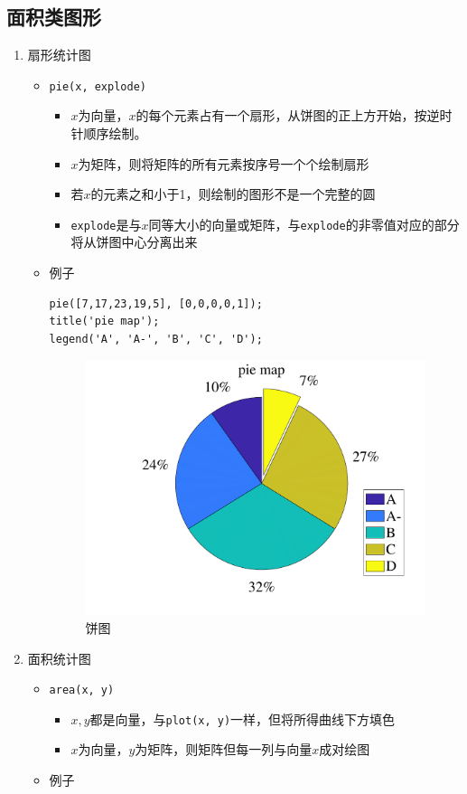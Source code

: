 \subsection{面积类图形}
\begin{enumerate}
	\item 扇形统计图
	\begin{itemize}
		\item \lstinline|pie(x, explode)|
		\begin{itemize}
			\item $x$为向量，$x$的每个元素占有一个扇形，从饼图的正上方开始，按逆时针顺序绘制。
			\item $x$为矩阵，则将矩阵的所有元素按序号一个个绘制扇形
			\item 若$x$的元素之和小于1，则绘制的图形不是一个完整的圆
			\item \lstinline|explode|是与$x$同等大小的向量或矩阵，与\lstinline|explode|的非零值对应的部分将从饼图中心分离出来
		\end{itemize}
	\item 例子
	\begin{lstlisting}
pie([7,17,23,19,5], [0,0,0,0,1]);
title('pie map');
legend('A', 'A-', 'B', 'C', 'D');
	\end{lstlisting}
\begin{figure}[!htb]
	\centering
	\includegraphics[width=0.5\linewidth]{pic/饼图.pdf}
	\caption{饼图}
\end{figure}
	\end{itemize}
	\item 面积统计图
	\begin{itemize}
		\item \lstinline|area(x, y)|
		\begin{itemize}
			\item $x,y$都是向量，与\lstinline|plot(x, y)|一样，但将所得曲线下方填色
			\item $x$为向量，$y$为矩阵，则矩阵但每一列与向量$x$成对绘图
		\end{itemize}
		\item 例子

\end{itemize}
\end{enumerate}
